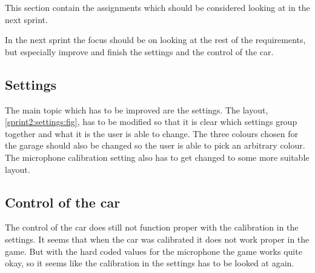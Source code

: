 This section contain the assignments which should be considered looking at in the next sprint.

In the next sprint the focus should be on looking at the rest of the requirements, but especially improve and finish the settings and the control of the car.

\subsection{Settings}
The main topic which has to be improved are the settings.
The layout, \cref{sprint2:settings:fig}, has to be modified so that it is clear which settings group together and what it is the user is able to change.
The three colours chosen for the garage should also be changed so the user is able to pick an arbitrary colour.
The microphone calibration setting also has to get changed to some more suitable layout.

\subsection{Control of the car}
The control of the car does still not function proper with the calibration in the settings.
It seems that when the car was calibrated it does not work proper in the game.
But with the hard coded values for the microphone the game works quite okay, so it seems like the calibration in the settings has to be looked at again.